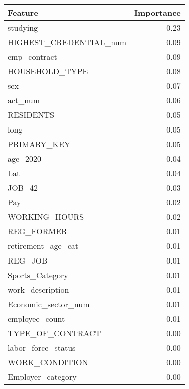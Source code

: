 \begin{tabular}{lr}
\toprule
Feature & Importance \\
\midrule
studying & 0.23 \\
HIGHEST_CREDENTIAL_num & 0.09 \\
emp_contract & 0.09 \\
HOUSEHOLD_TYPE & 0.08 \\
sex & 0.07 \\
act_num & 0.06 \\
RESIDENTS & 0.05 \\
long & 0.05 \\
PRIMARY_KEY & 0.05 \\
age_2020 & 0.04 \\
Lat & 0.04 \\
JOB_42 & 0.03 \\
Pay & 0.02 \\
WORKING_HOURS & 0.02 \\
REG_FORMER & 0.01 \\
retirement_age_cat & 0.01 \\
REG_JOB & 0.01 \\
Sports_Category & 0.01 \\
work_description & 0.01 \\
Economic_sector_num & 0.01 \\
employee_count & 0.01 \\
TYPE_OF_CONTRACT & 0.00 \\
labor_force_status & 0.00 \\
WORK_CONDITION & 0.00 \\
Employer_category & 0.00 \\
\bottomrule
\end{tabular}
